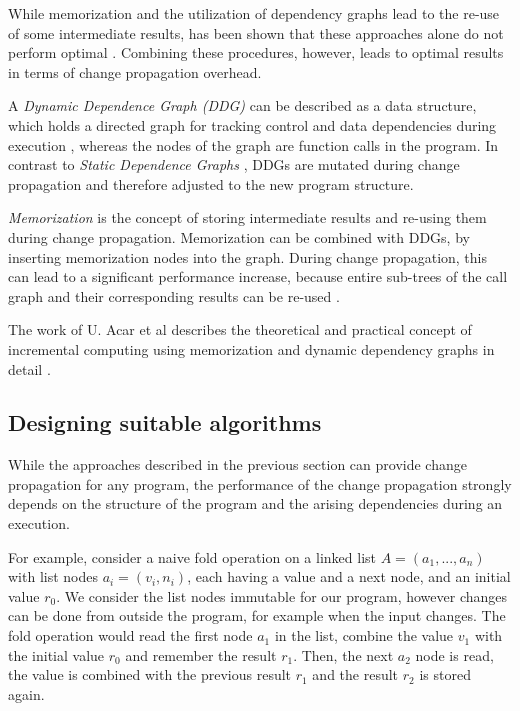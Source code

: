 While memorization and the utilization of dependency graphs lead to the re-use of some intermediate results, has been shown that these approaches alone do not perform optimal \cite{Acar2005thesis}. Combining these procedures, however, leads to optimal results in terms of change propagation overhead. 

A \textit{Dynamic Dependence Graph (DDG)} can be described as a data structure, which holds a directed graph for tracking control and data dependencies during execution \cite{Acar2005thesis}, whereas the nodes of the graph are function calls in the program. In contrast to \textit{Static Dependence Graphs} \cite{Demers1981}, DDGs are mutated during change propagation and therefore adjusted to the new program structure. 

\textit{Memorization} is the concept of storing intermediate results and re-using them during change propagation. Memorization can be combined with DDGs, by inserting memorization nodes into the graph. During change propagation, this can lead to a significant performance increase, because entire sub-trees of the call graph and their corresponding results can be re-used \cite{Acar2005thesis}.

The work of U. Acar et al describes the theoretical and practical concept of incremental computing using memorization and dynamic dependency graphs in detail \cite{Acar2005thesis}.

\subsection{Designing suitable algorithms}

While the approaches described in the previous section can provide change propagation for any program, the performance of the change propagation strongly depends on the structure of the program and the arising dependencies during an execution. 

For example, consider a naive fold operation on a linked list $A = (a_1, ..., a_n)$ with list nodes $a_i = (v_i, n_i)$, each having a value and a next node, and an initial value $r_0$. We consider the list nodes immutable for our program, however changes can be done from outside the program, for example when the input changes. The fold operation would read the first node $a_1$ in the list, combine the value $v_1$ with the initial value $r_0$ and remember the result $r_1$. Then, the next $a_2$ node is read, the value is combined with the previous result $r_1$ and the result $r_2$ is stored again. 

